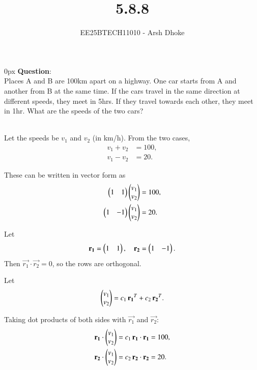 \documentclass[journal]{IEEEtran}
\begin{document}

\vspace{3cm}

\title{5.8.8}
\author{EE25BTECH11010 - Arsh Dhoke}
{\let\newpage\relax\maketitle}

\renewcommand{\thefigure}{\theenumi}
\renewcommand{\thetable}{\theenumi}
\setlength{\intextsep}{10pt}
\renewcommand{\thetable}{\theenumi}

\parindent 0px
\textbf{Question}:\\
Places A and B are 100km apart on a highway. One car starts from A and another from B at the same time. If the cars travel in the same direction at different speeds, they meet in 5hrs. If they travel towards each other, they meet in 1hr. What are the speeds of the two cars?

\solution \\
Let the speeds be $v_1$ and $v_2$ (in km/h). From the two cases,
\begin{align}
\label{eq:sys1} v_1 + v_2 &= 100, \\
\label{eq:sys2} v_1 - v_2 &= 20.
\end{align}

These can be written in vector form as
\begin{align}
\begin{pmatrix}1 & 1\end{pmatrix} \begin{pmatrix}v_1 \\ v_2\end{pmatrix} &= 100, \\
\begin{pmatrix}1 & -1\end{pmatrix} \begin{pmatrix}v_1 \\ v_2\end{pmatrix} &= 20.
\end{align}

Let 
\begin{align}
\mathbf{r_1} = \begin{pmatrix}1 & 1\end{pmatrix}, \quad \mathbf{r_2} = \begin{pmatrix}1 & -1\end{pmatrix}.
\end{align}
Then \(\vec{r_1}\cdot\vec{r_2}=0\), so the rows are orthogonal.

Let
\begin{align}
\begin{pmatrix}v_1 \\ v_2\end{pmatrix} = c_1\,\mathbf{r_1}^{T} + c_2\,\mathbf{r_2}^{T}.
\end{align}

Taking dot products of both sides with \(\vec{r_1}\) and \(\vec{r_2}\):
\begin{align}
\mathbf{r_1}\cdot\begin{pmatrix}v_1 \\ v_2\end{pmatrix} &= c_1\,\mathbf{r_1}\cdot\mathbf{r_1} = 100, \\
\mathbf{r_2}\cdot\begin{pmatrix}v_1 \\ v_2\end{pmatrix} &= c_2\,\mathbf{r_2}\cdot\mathbf{r_2} = 20.
\end{align}
\end{document}

